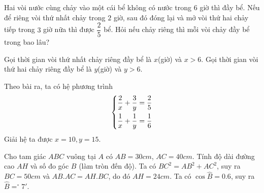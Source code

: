 \begin{ex}%
   Hai vòi nước cùng chảy vào một cái bể không có nước trong $6$ giờ thì đầy bể. Nếu để riêng vòi thứ nhất chảy trong $2$ giờ, sau đó đóng lại và mở vòi thứ hai chảy tiếp trong $3$ giờ nữa thì được $\dfrac{2}{5}$ bể. Hỏi nếu chảy riêng thì mỗi vòi chảy đầy bể trong bao lâu?
\loigiai
    {
    Gọi thời gian vòi thứ nhất chảy riêng đầy bể là $x$(giờ) và $x>6$.
    Gọi thời gian vòi thứ hai chảy riêng đầy bể là $y$(giờ) và $y>6$.
    
    Theo bài ra, ta có hệ phương trình $$\left\{\begin{aligned}&\dfrac{2}{x}+\dfrac{3}{y}=\dfrac{2}{5}\\&\dfrac{1}{x}+\dfrac{1}{y}=\dfrac{1}{6}\end{aligned}\right.$$ Giải hệ ta được $x=10,y=15$.
    }
\end{ex}
\begin{ex}%
Cho tam giác $ABC$ vuông tại $A$ có $AB=30 cm$, $AC=40 cm$. Tính độ dài đường cao $AH$ và số đo góc $B$ (làm tròn đến độ).
\loigiai Ta có $BC^2=AB^2+AC^2$, suy ra $BC=50cm$ và $AB.AC=AH.BC$, do đó $AH=24cm$.
Ta có $\cos \widehat{B}=0.6$, suy ra $\widehat{B}=^\circ7'$.
\end{ex}
